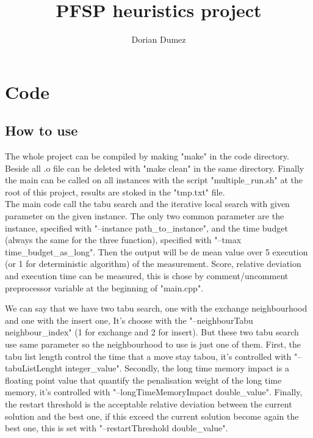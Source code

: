 \documentclass[12pt,a4paper]{article}
\title{PFSP heuristics project}
\author{Dorian Dumez}
\begin{document}
\maketitle

\section{Code}

\subsection{How to use}

The whole project can be compiled by making "make" in the code directory. Beside all .o file can be deleted with "make clean" in the same directory. Finally the main can be called on all instances with the script "multiple\_run.sh" at the root of this project, results are stoked in the "tmp.txt" file.\\

The main code call the tabu search and the iterative local search with given parameter on the given instance. The only two common parameter are the instance, specified with "--instance path\_to\_instance", and the time budget (always the same for the three function), specified with "--tmax time\_budget\_as\_long". Then the output will be de mean value over 5 execution (or 1 for deterministic algorithm) of the measurement. Score, relative deviation and execution time can be measured, this is chose by comment/uncomment preprocessor variable at the beginning of "main.cpp".

We can say that we have two tabu search, one with the exchange neighbourhood and one with the insert one, It's choose with the "--neighbourTabu neighbour\_index" (1 for exchange and 2 for insert). But these two tabu search use same parameter so the neighbourhood to use is just one of them. First, the tabu list length control the time that a move stay tabou, it's controlled with "--tabuListLenght integer\_value". Secondly, the long time memory impact is a floating point value that quantify the penalisation weight of the long time memory, it's controlled with "--longTimeMemoryImpact double\_value". Finally, the restart threshold is the acceptable relative deviation between the current solution and the best one, if this exceed the current solution become again the best one, this is set with "--restartThreshold double\_value".
\end{document}
